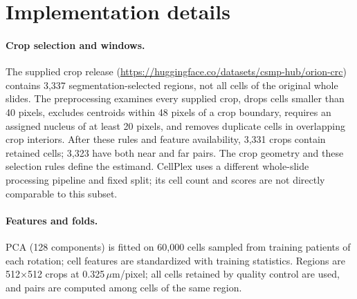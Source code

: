 \documentclass[10pt,letterpaper]{article}
\theoremstyle{definition}
\theoremstyle{remark}
\begin{document}
\section{Implementation details}
\label{app:impl}
\paragraph{Crop selection and windows.} The supplied crop release (\url{https://huggingface.co/datasets/csmp-hub/orion-crc}) contains 3,337 segmentation-selected regions, not all cells of the original whole slides. The preprocessing examines every supplied crop, drops cells smaller than 40 pixels, excludes centroids within 48 pixels of a crop boundary, requires an assigned nucleus of at least 20 pixels, and removes duplicate cells in overlapping crop interiors. After these rules and feature availability, 3,331 crops contain retained cells; 3,323 have both near and far pairs. The crop geometry and these selection rules define the estimand. CellPlex uses a different whole-slide processing pipeline and fixed split; its cell count and scores are not directly comparable to this subset.

\paragraph{Features and folds.} PCA (128 components) is fitted on 60,000 cells sampled from training patients of each rotation; cell features are standardized with training statistics. Regions are 512$\times$512 crops at 0.325\,$\mu$m/pixel; all cells retained by quality control are used, and pairs are computed among cells of the same region.
\end{document}
